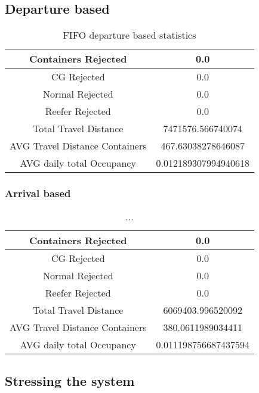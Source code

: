 \documentclass[]{article}
\begin{document}
\subsection{Departure based}

\begin{table}[h]
	\centering
	\begin{tabular}{|c|c|}
		\hline
		Containers Rejected            & 0.0                  \\ \hline
		CG Rejected                    & 0.0                  \\ \hline
		Normal Rejected                & 0.0                  \\ \hline
		Reefer Rejected                & 0.0                  \\ \hline
		Total Travel Distance          & 7471576.566740074    \\ \hline
		AVG Travel Distance Containers & 467.63038278646087   \\ \hline
		AVG daily total Occupancy      & 0.012189307994940618 \\ \hline
	\end{tabular}
	\caption{FIFO departure based statistics}
\end{table}

\subsubsection{Arrival based}

\begin{table}[h]
	\centering
	\begin{tabular}{|c|c|}
		\hline
		Containers Rejected            & 0.0                  \\ \hline
		CG Rejected                    & 0.0                  \\ \hline
		Normal Rejected                & 0.0                  \\ \hline
		Reefer Rejected                & 0.0                  \\ \hline
		Total Travel Distance          & 6069403.996520092    \\ \hline
		AVG Travel Distance Containers & 380.0611989034411    \\ \hline
		AVG daily total Occupancy      & 0.011198756687437594 \\ \hline
	\end{tabular}
	\caption{...}
\end{table}
\subsection{Stressing the system}
\end{document}
